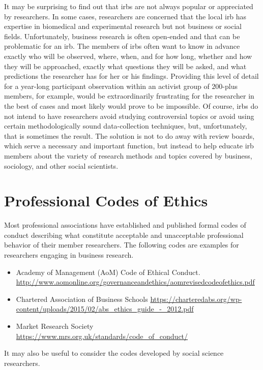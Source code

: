 It may be surprising to find out that \glspl{irb} are not always popular or appreciated by researchers. In some cases, researchers are concerned that the local \gls{irb} has expertise in biomedical and experimental research but not business or social fields. Unfortunately, business research is often open-ended and that can be problematic for an \gls{irb}. The members of \glspl{irb} often want to know in advance exactly who will be observed, where, when, and for how long, whether and how they will be approached, exactly what questions they will be asked, and what predictions the researcher has for her or his findings. Providing this level of detail for a year-long participant observation within an activist group of $ 200 $-plus members, for example, would be extraordinarily frustrating for the researcher in the best of cases and most likely would prove to be impossible. Of course, \glspl{irb} do not intend to have researchers avoid studying controversial topics or avoid using certain methodologically sound data-collection techniques, but, unfortunately, that is sometimes the result. The solution is not to do away with review boards, which serve a necessary and important function, but instead to help educate \gls{irb} members about the variety of research methods and topics covered by business, sociology, and other social scientists.

\section{Professional Codes of Ethics}

Most professional associations have established and published formal codes of conduct describing what constitute acceptable and unacceptable professional behavior of their member researchers. The following codes are examples for researchers engaging in business research.

\begin{itemize}
	\item Academy of Management (AoM) Code of Ethical Conduct. \url{http://www.aomonline.org/governanceandethics/aomrevisedcodeofethics.pdf}
	\item Chartered Association of Business Schools \url{https://charteredabs.org/wp-content/uploads/2015/02/abs_ethics_guide_-_2012.pdf}
	\item Market Research Society \url{https://www.mrs.org.uk/standards/code_of_conduct/}
\end{itemize}

It may also be useful to consider the codes developed by social science researchers.

